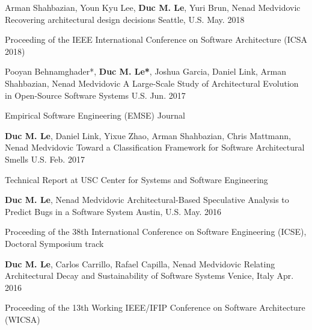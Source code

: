\begin{cventries}
\cventry
{Arman	Shahbazian, Youn Kyu Lee, \textbf{Duc M. Le}, Yuri Brun, Nenad Medvidovic} %
{Recovering architectural design decisions} %
{Seattle, U.S.} %
{May. 2018} %
{
	\begin{cvitems} %
		\item Proceeding of the IEEE International Conference on Software Architecture (ICSA 2018)
	\end{cvitems}
}

  \cventry
    {Pooyan Behnamghader*, \textbf{Duc M. Le*}, Joshua Garcia, Daniel	Link, Arman	Shahbazian, Nenad Medvidovic} %
    {A Large-Scale Study of Architectural Evolution in Open-Source Software Systems} %
    {U.S. } %
    {Jun. 2017} %
    {
      \begin{cvitems} %
        \item Empirical Software Engineering (EMSE) Journal 
      \end{cvitems}
    }

\cventry
{\textbf{Duc M. Le}, Daniel	Link, Yixue Zhao, Arman	Shahbazian, Chris Mattmann, Nenad Medvidovic} %
{Toward a Classification Framework for Software Architectural Smells} %
{U.S. } %
{Feb. 2017} %
{
	\begin{cvitems} %
		\item Technical Report at USC Center for Systems and Software Engineering 
	\end{cvitems}
}
    

\cventry
{\textbf{Duc M. Le}, Nenad Medvidovic} %
{Architectural-Based Speculative Analysis to Predict Bugs in a Software System} %
{Austin, U.S.} %
{May. 2016} %
{
	\begin{cvitems} %
		\item Proceeding of the 38th International Conference on Software Engineering (ICSE), Doctoral Symposium track
	\end{cvitems}
}
	
\cventry
{\textbf{Duc M. Le}, Carlos Carrillo, Rafael Capilla, Nenad Medvidovic} %
{Relating Architectural Decay and Sustainability of Software Systems} %
{Venice, Italy} %
{Apr. 2016} %
{
	\begin{cvitems} %
		\item Proceeding of the 13th Working IEEE/IFIP Conference on Software Architecture (WICSA)
	\end{cvitems}
}



\end{cventries}
